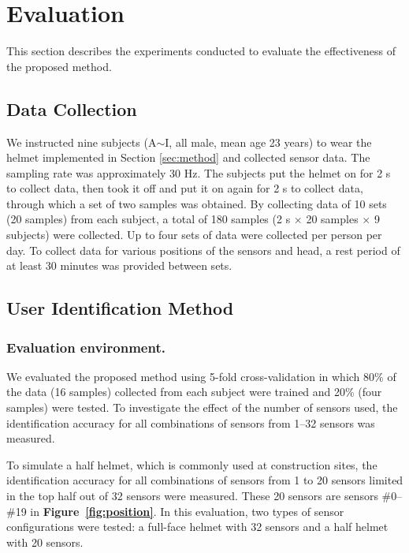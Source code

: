 \documentclass[sigconf,authordraft]{acmart}
\newcommand\figref[1]{\textbf{Figure~\ref{fig:#1}}}
\begin{document}
\section{Evaluation}
\label{sec:evaluation}
This section describes the experiments conducted to evaluate the effectiveness of the proposed method.


\subsection{Data Collection}
We instructed nine subjects (A$\sim$I, all male, mean age 23 years) to wear the helmet implemented in Section \ref{sec:method} and collected sensor data. The sampling rate was approximately 30 Hz. The subjects put the helmet on for 2 s to collect data, then took it off and put it on again for 2 s to collect data, through which a set of two samples was obtained. By collecting data of 10 sets (20 samples) from each subject, a total of 180 samples (2 s $\times$ 20 samples $\times$ 9 subjects) were collected. Up to four sets of data were collected per person per day. To collect data for various positions of the sensors and head, a rest period of at least 30 minutes was provided between sets.


\subsection{User Identification Method}
\subsubsection{Evaluation environment.}
We evaluated the proposed method using 5-fold cross-validation in which 80\% of the data (16 samples) collected from each subject were trained and 20\% (four samples) were tested. To investigate the effect of the number of sensors used, the identification accuracy for all combinations of sensors from 1–32 sensors was measured.\par

To simulate a half helmet, which is commonly used at construction sites, the identification accuracy for all combinations of sensors from 1 to 20 sensors limited in the top half out of 32 sensors were measured. These 20 sensors are sensors \#0--\#19 in \figref{position}. In this evaluation, two types of sensor configurations were tested: a full-face helmet with 32 sensors and a half helmet with 20 sensors.
\end{document}
